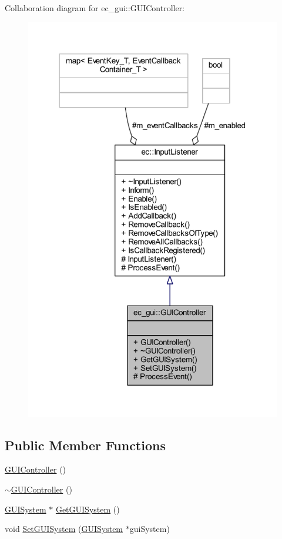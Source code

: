 Collaboration diagram for ec\+\_\+gui\+:\+:G\+U\+I\+Controller\+:\nopagebreak
\begin{figure}[H]
\begin{center}
\leavevmode
\includegraphics[width=318pt]{classec__gui_1_1_g_u_i_controller__coll__graph}
\end{center}
\end{figure}
\subsection*{Public Member Functions}
\begin{DoxyCompactItemize}
\item 
\mbox{\hyperlink{classec__gui_1_1_g_u_i_controller_aca15c08ca8cc2437e6c563e51eaf3a64}{G\+U\+I\+Controller}} ()
\item 
\mbox{\hyperlink{classec__gui_1_1_g_u_i_controller_ada2d56355a38d965097aefaba51e330a}{$\sim$\+G\+U\+I\+Controller}} ()
\item 
\mbox{\hyperlink{classec__gui_1_1_g_u_i_system}{G\+U\+I\+System}} $\ast$ \mbox{\hyperlink{classec__gui_1_1_g_u_i_controller_ad4d8b46c9f7028fe545b479abdaab9d6}{Get\+G\+U\+I\+System}} ()
\item 
void \mbox{\hyperlink{classec__gui_1_1_g_u_i_controller_a091b761c8d7cabf5c9c2af3d921cb58c}{Set\+G\+U\+I\+System}} (\mbox{\hyperlink{classec__gui_1_1_g_u_i_system}{G\+U\+I\+System}} $\ast$gui\+System)
\end{DoxyCompactItemize}
